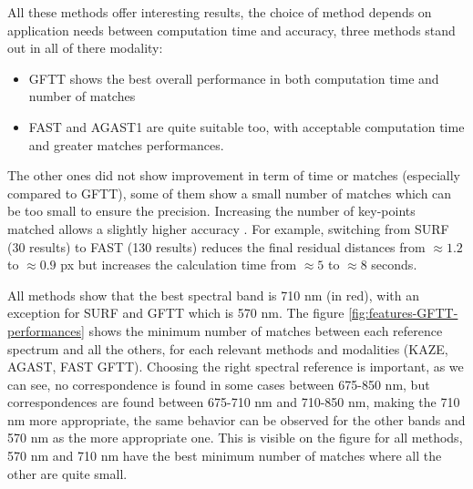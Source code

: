 \documentclass[a4paper,twoside]{article}
\begin{document}
	All these methods offer interesting results, the choice of method depends on application needs between computation time and accuracy,
	three methods stand out in all of there modality:
	
	\begin{itemize}
		\item GFTT shows the best overall performance in both computation time and number of matches
		\item FAST and AGAST1 are quite suitable too, with acceptable computation time and greater matches performances.
	\end{itemize}
	
	\noindent
	The other ones did not show improvement in term of time or matches (especially compared to GFTT),
	some of them show a small number of matches which can be too small to ensure the precision.
	Increasing the number of key-points matched allows a slightly higher accuracy \cite{DantasDiasJunior}.
	For example, switching from SURF (30 results) to FAST (130 results) reduces the final residual distances
	from $\approx 1.2$ to $\approx 0.9$ px but increases the calculation time from $\approx 5$ to $\approx 8$ seconds.
	\\
	\par All methods show that the best spectral band is 710 nm (in red), with an exception for SURF and GFTT which is 570 nm.
	The figure \ref{fig:features-GFTT-performances} shows the minimum number of matches between each reference spectrum and all the others, for each relevant methods and modalities (KAZE, AGAST, FAST GFTT).
	Choosing the right spectral reference is important, as we can see, no correspondence is found in some cases between 675-850 nm,
	but correspondences are found between 675-710 nm and 710-850 nm,
	making the 710 nm more appropriate,
	the same behavior can be observed for the other bands and 570 nm as the more appropriate one.
	This is visible on the figure for all methods, 570 nm and 710 nm have the best minimum number of matches where all the other are quite small.
	
\end{document}
